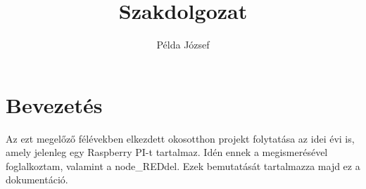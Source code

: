 \documentclass[a4paper,12pt,oneside]{report}
\begin{document}
\pagestyle{fancy}
\fancyhead[]{}
\fancyhead[C]{\thepage}
\fancyfoot[]{}
\fancyfoot[]{}
\renewcommand{\headrulewidth}{0pt}
\renewcommand{\footrulewidth}{0pt}




\title{Szakdolgozat}

\author{Példa József}

\date{}

\maketitle

\tableofcontents

\chapter{Bevezetés}

Az ezt megelőző félévekben elkezdett okosotthon projekt folytatása az idei évi is, amely jelenleg egy Raspberry PI-t tartalmaz.
Idén ennek a megismerésével foglalkoztam, valamint a node_REDdel. Ezek bemutatását tartalmazza majd ez a dokumentáció.



\end{document}
